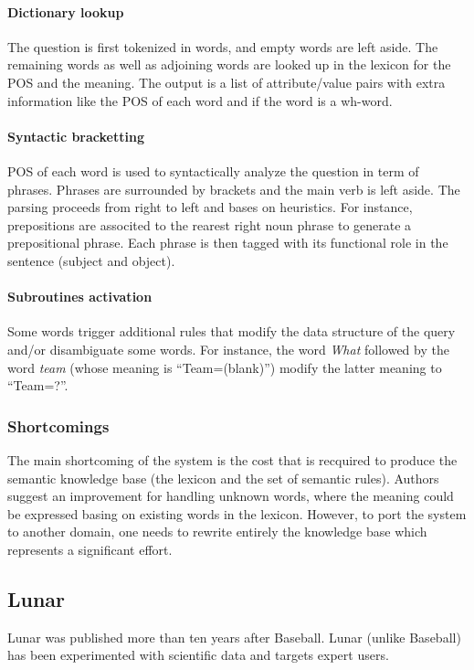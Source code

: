 \documentclass[10pt,journal,letterpaper,compsoc]{IEEEtran}
\begin{document}
\paragraph{Dictionary lookup}
The question is first tokenized in words, and empty words are left aside.
The remaining words as well as adjoining words are looked up in the lexicon for
the POS and the meaning. The output is a list of attribute/value pairs with
extra information like the POS of each word and if the word is a wh-word. 


\paragraph{Syntactic bracketting}
POS of each word is used to syntactically analyze the question in term of
phrases. Phrases are surrounded by brackets and the main verb is left aside.
The parsing proceeds from right to left and bases on heuristics. For instance,
prepositions are associted to the rearest right noun phrase to generate a
prepositional phrase. 
Each phrase is then tagged with its functional role in the sentence (subject
and object).


\paragraph{Subroutines activation}
Some words trigger additional rules that modify the data structure of the query
and/or disambiguate some words. 
For instance, the word {\it What} followed by the word {\it team} (whose
meaning is ``Team=(blank)'') modify the latter meaning to ``Team=?''. 




\subsubsection{Shortcomings}
The main shortcoming of the system is the cost that is recquired to produce the
semantic knowledge base (the lexicon and the set of semantic rules).
Authors suggest an improvement for handling unknown words, where the meaning
could be expressed basing on existing words in the lexicon.
However, to port the system to another domain, one needs to rewrite entirely the
knowledge base which represents a significant effort. 






\subsection{{\sc Lunar}~\cite{Woods:1973:PNL:1499586.1499695}}
{\sc Lunar} was published more than ten years after {\sc Baseball}. 
{\sc Lunar} (unlike {\sc Baseball}) has been experimented with scientific data
and targets expert users. 
\end{document}
